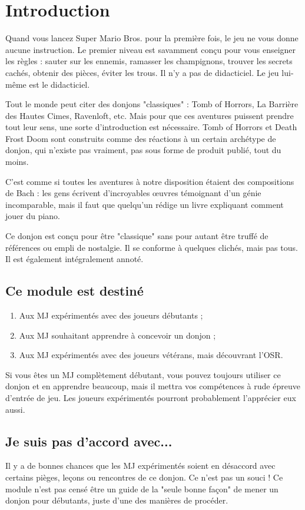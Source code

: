 \chapter{Introduction}

Quand vous lancez Super Mario Bros. pour la première fois, le jeu ne vous donne aucune instruction.
Le premier niveau est savamment conçu pour vous enseigner les règles : sauter sur les ennemis, ramasser les champignons, trouver les secrets cachés, obtenir des pièces, éviter les trous.
Il n'y a pas de didacticiel.
Le jeu lui-même est le didacticiel.

Tout le monde peut citer des donjons "classiques" : Tomb of Horrors, La Barrière des Hautes Cimes, Ravenloft, etc.
Mais pour que ces aventures puissent prendre tout leur sens, une sorte d'introduction est nécessaire.
Tomb of Horrors et Death Frost Doom sont construits comme des réactions à un certain archétype de donjon, qui n'existe pas vraiment, pas sous forme de produit publié, tout du moins.

C'est comme si toutes les aventures à notre disposition étaient des compositions de Bach : les gens écrivent d'incroyables œuvres témoignant d'un génie incomparable, mais il faut que quelqu'un rédige un livre expliquant comment jouer du piano.

Ce donjon est conçu pour être "classique" sans pour autant être truffé de références ou empli de nostalgie.
Il se conforme à quelques clichés, mais pas tous. Il est également intégralement annoté.

\section{Ce module est destiné}
\begin{enumerate}
  \item Aux MJ expérimentés avec des joueurs débutants ;
  \item Aux MJ souhaitant apprendre à concevoir un donjon ;
  \item Aux MJ expérimentés avec des joueurs vétérans, mais découvrant l'OSR.
\end{enumerate}
Si vous êtes un MJ complètement débutant, vous pouvez toujours utiliser ce donjon et en apprendre beaucoup, mais il
mettra vos compétences à rude épreuve d'entrée de jeu.
Les joueurs expérimentés pourront probablement l'apprécier eux aussi.

\section{Je suis pas d'accord avec...}
Il y a de bonnes chances que les MJ expérimentés soient en désaccord avec certains pièges, leçons ou rencontres de ce
donjon.
Ce n'est pas un souci ! Ce module n'est pas censé être un guide de la "seule bonne façon" de mener un donjon
pour débutants, juste d'une des manières de procéder.

